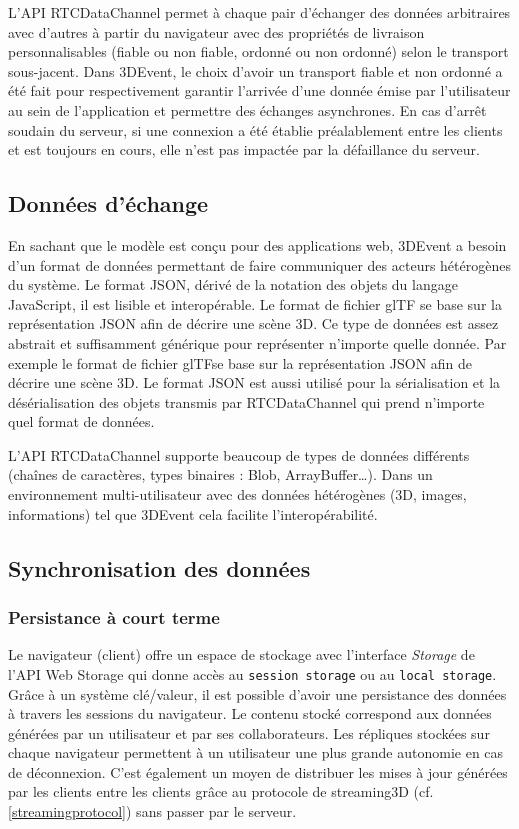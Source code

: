 L'API RTCDataChannel permet à chaque pair d'échanger des données arbitraires 
avec d'autres à partir du navigateur avec des propriétés de livraison 
personnalisables (fiable ou non fiable, ordonné ou non ordonné) selon le transport 
sous-jacent. Dans 3DEvent, le choix d'avoir un transport fiable 
et non ordonné a été fait pour respectivement 
garantir l'arrivée d'une donnée émise par l'utilisateur au sein de l'application et 
permettre des échanges asynchrones.
En cas d'arrêt soudain du serveur, si une connexion a été établie préalablement 
entre les clients et est toujours en cours, elle n'est pas impactée par la défaillance 
du serveur.
\subsection{Données d'échange}
En sachant que le modèle est conçu pour des applications web, 3DEvent a besoin 
d'un format de données permettant de faire communiquer des acteurs hétérogènes 
du système. Le format \gls{JSON}, dérivé de la notation des objets du langage 
JavaScript, il est lisible et interopérable. 
Le format de fichier \gls{glTF} se base sur la représentation \gls{JSON} afin de 
décrire une scène 3D.
Ce type de données est assez abstrait et suffisamment générique pour 
représenter n'importe quelle donnée. Par exemple le format de fichier 
\gls{glTF}se base sur la représentation \gls{JSON} afin de 
décrire une scène 3D.
Le format \gls{JSON} est aussi utilisé pour la sérialisation et la désérialisation des 
objets transmis par RTCDataChannel qui prend n'importe quel format de données.

L'\acrshort{API} RTCDataChannel supporte beaucoup de types de données 
différents (chaînes de caractères, types binaires : Blob, ArrayBuffer\dots). Dans 
un environnement multi-utilisateur avec des données hétérogènes (3D, images, 
informations) tel que 3DEvent cela facilite l'interopérabilité.


\subsection{Synchronisation des données}
\subsubsection{Persistance à court terme}
Le navigateur (client) offre un espace de stockage avec l'interface \textit{Storage} 
de l'API Web Storage qui donne accès au \texttt{session storage} ou au  
\texttt{local storage}. Grâce à un système clé/valeur, il est possible d'avoir une 
persistance des données à travers les sessions du navigateur. Le contenu stocké 
correspond aux données générées par un utilisateur et par ses collaborateurs. Les 
répliques stockées sur chaque navigateur permettent à un utilisateur une plus 
grande 
autonomie en cas de déconnexion. C'est également un moyen de distribuer les 
mises à jour générées par les clients entre les clients grâce au protocole de 
\gls{streaming3D} (cf. \ref{streamingprotocol}) sans passer par le serveur.

